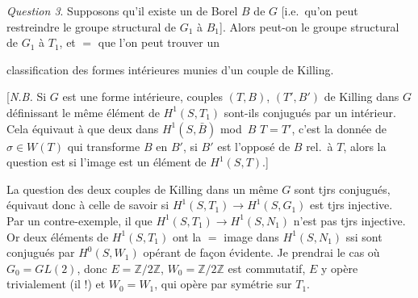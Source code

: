 \documentclass[11pt,a4paper]{article}
\begin{document}

\emph{Question 3}. Supposons qu'il existe
un  de Borel $B$ de $G$ [i.e.\ qu'on
peut restreindre le
groupe structural de $G_1$ à $B_1$]. Alors
peut-on  le groupe
structural   de $G_1$ à $T_1$, et $=$
 \struck{\ill{}}  que l'on peut
trouver un 




classification des formes intérieures
munies d'un couple de Killing.

[\emph{N.B.} Si $G$ est une forme intérieure,  couples
$(T, B)$, $(T', B')$ de Killing dans $G$ définissant
le même élément de $H^1(S, T_1)$ sont-ils
conjugués par un 
intérieur. Cela équivaut à 
que deux \ill{}   
dans $H^1(S, \bar B)$ mod~$B$ \ill{}
 $T = T'$, c'est la donnée
de $\sigma \in W(T)$ qui transforme $B$
en $B'$, si $B'$ est l'opposé de
$B$ rel.\ à $T$, alors la question
est 
si l'image  est un
élément  de $H^1(S, T)$.]

La question des deux couples de Killing dans un
même $G$ sont tjrs conjugués,
équivaut donc à celle de
savoir si $H^1(S, T_1) \to H^1(S, G_1)$ est
tjrs injective. Par un
contre-exemple, il  \ill{} 
que $H^1(S, T_1) \to H^1(S, N_1)$ n'est
pas tjrs injective. Or
deux éléments de $H^1(S, T_1)$ ont la $=$
image dans $H^1(S, N_1)$
ssi  sont conjugués par
$H^0(S, W_1)$ opérant de façon
évidente. Je prendrai le
cas où $G_0 = GL(2)$, donc
$E = \mathbb{Z}/2\mathbb{Z}$, $W_0 = \mathbb{Z}/2\mathbb{Z}$
est commutatif,  $E$ y opère trivialement
(il \ill{} \ill{} !) et
$W_0 = W_1$, qui opère par
symétrie sur $T_1$.
\end{document}
